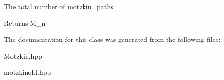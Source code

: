 The total number of motzkin\-\_\-paths. 

\begin{DoxyReturn}{Returns}
M\-\_\-n 
\end{DoxyReturn}


The documentation for this class was generated from the following files\-:\begin{DoxyCompactItemize}
\item 
Motzkin.\-hpp\item 
motzkinold.\-hpp\end{DoxyCompactItemize}
